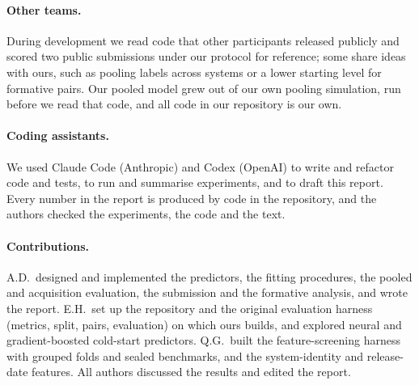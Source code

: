 \documentclass{article}
\begin{document}
\paragraph{Other teams.} During development we read code that other participants released publicly and scored two public submissions under our protocol for reference; some share ideas with ours, such as pooling labels across systems or a lower starting level for formative pairs. Our pooled model grew out of our own pooling simulation, run before we read that code, and all code in our repository is our own.

\paragraph{Coding assistants.} We used Claude Code (Anthropic) and Codex (OpenAI) to write and refactor code and tests, to run and summarise experiments, and to draft this report. Every number in the report is produced by code in the repository, and the authors checked the experiments, the code and the text.

\paragraph{Contributions.} A.D.\ designed and implemented the predictors, the fitting procedures, the pooled and acquisition evaluation, the submission and the formative analysis, and wrote the report. E.H.\ set up the repository and the original evaluation harness (metrics, split, pairs, evaluation) on which ours builds, and explored neural and gradient-boosted cold-start predictors. Q.G.\ built the feature-screening harness with grouped folds and sealed benchmarks, and the system-identity and release-date features. All authors discussed the results and edited the report.
\end{document}
